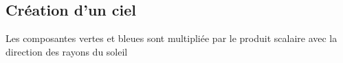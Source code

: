 \subsection{Création d'un ciel}
Les composantes vertes et bleues sont multipliée par le produit scalaire avec la direction des rayons du soleil